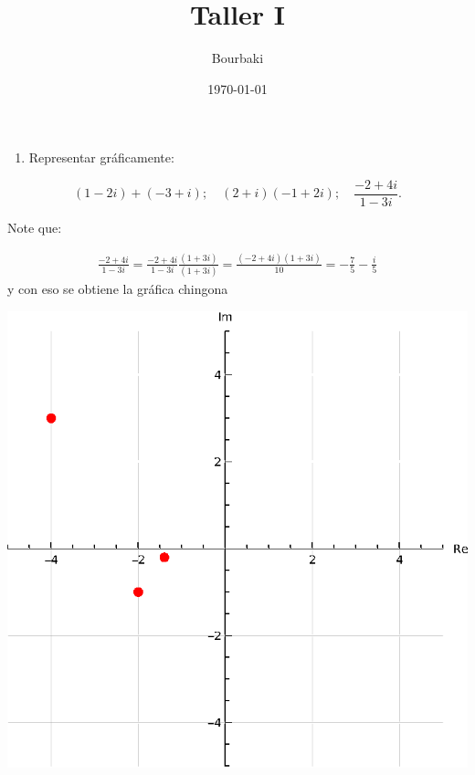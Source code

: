 \documentclass[11pt]{article}
\title{Taller I}
\author{Bourbaki}
\date{\today}
\begin{document}
\maketitle
\begin{enumerate}
  \item Representar gráficamente:
\end{enumerate}

$$
(1-2 i)+(-3+i) ; \quad(2+i)(-1+2 i) ; \quad \frac{-2+4 i}{1-3 i}.
$$

Note que:

\begin{align*}
  \frac{-2+4 i}{1-3 i}=\frac{-2+4 i}{1-3 i}\frac{(1+3i)}{(1+3i)}=\frac{(-2+4i)(1+3i)}{10}=-\frac{7}{5}-\frac{i}{5}
\end{align*}
y con eso se obtiene la gráfica chingona
\begin{center}
\includegraphics[scale=0.8]{Punto1}
\end{center}
\end{document}
